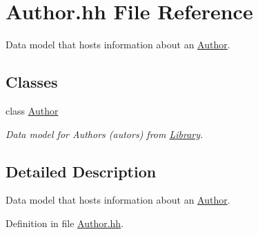 \hypertarget{_author_8hh}{\section{Author.\+hh File Reference}
\label{_author_8hh}
}


Data model that hosts information about an \hyperlink{class_author}{Author}.  


\subsection*{Classes}
\begin{DoxyCompactItemize}
\item 
class \hyperlink{class_author}{Author}
\begin{DoxyCompactList}\small\item\em Data model for Authors (autors) from \hyperlink{class_library}{Library}. \end{DoxyCompactList}\end{DoxyCompactItemize}


\subsection{Detailed Description}
Data model that hosts information about an \hyperlink{class_author}{Author}. 



Definition in file \hyperlink{_author_8hh_source}{Author.\+hh}.

